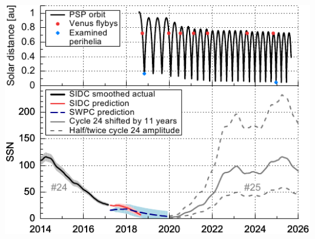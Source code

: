 \documentclass[11pt,aspectratio=1610]{beamer}	%
\newcommand{\captionoftiny}[2]{\captionof{#1}{\color{gray} \tiny #2}}
\begin{document}
\begin{frame}[c]{}{}
	\begin{columns}[c]
		
		\includegraphics[width=\textwidth]{../figures_paper/SPP_orbit_predicted_SSN_overview_f_plot.pdf}


	\end{columns}
\end{frame}
\end{document}
